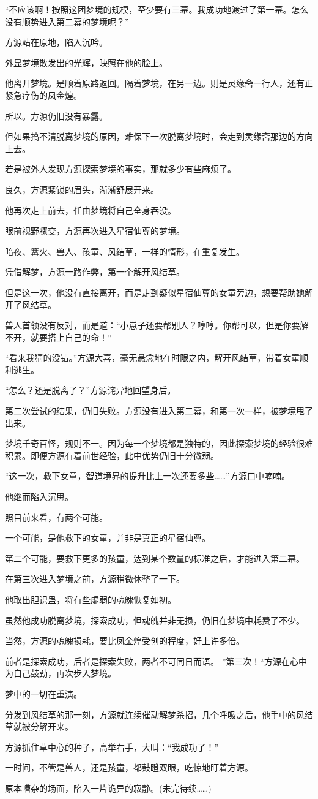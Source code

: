 \begin{this_body}
“不应该啊！按照这团梦境的规模，至少要有三幕。我成功地渡过了第一幕。怎么没有顺势进入第二幕的梦境呢？”

方源站在原地，陷入沉吟。

外显梦境散发出的光辉，映照在他的脸上。

他离开梦境。是顺着原路返回。隔着梦境，在另一边。则是灵缘斋一行人，还有正紧急疗伤的凤金煌。

所以。方源仍旧没有暴露。

但如果搞不清脱离梦境的原因，难保下一次脱离梦境时，会走到灵缘斋那边的方向上去。

若是被外人发现方源探索梦境的事实，那就多少有些麻烦了。

良久，方源紧锁的眉头，渐渐舒展开来。

他再次走上前去，任由梦境将自己全身吞没。

眼前视野骤变，方源再次进入星宿仙尊的梦境。

暗夜、篝火、兽人、孩童、风结草，一样的情形，在重复发生。

凭借解梦，方源一路作弊，第一个解开风结草。

但是这一次，他没有直接离开，而是走到疑似星宿仙尊的女童旁边，想要帮助她解开了风结草。

兽人首领没有反对，而是道：“小崽子还要帮别人？哼哼。你帮可以，但是你要解不开，就要搭上自己的命！”

“看来我猜的没错。”方源大喜，毫无悬念地在时限之内，解开风结草，带着女童顺利逃生。

“怎么？还是脱离了？”方源诧异地回望身后。

第二次尝试的结果，仍旧失败。方源没有进入第二幕，和第一次一样，被梦境甩了出来。

梦境千奇百怪，规则不一。因为每一个梦境都是独特的，因此探索梦境的经验很难积累。即便方源有着前世经验，此中优势仍旧十分微弱。

“这一次，救下女童，智道境界的提升比上一次还要多些……”方源口中喃喃。

他继而陷入沉思。

照目前来看，有两个可能。

一个可能，是他救下的女童，并非是真正的星宿仙尊。

第二个可能，要救下更多的孩童，达到某个数量的标准之后，才能进入第二幕。

在第三次进入梦境之前，方源稍微休整了一下。

他取出胆识蛊，将有些虚弱的魂魄恢复如初。

虽然他成功脱离梦境，探索成功，但魂魄并非无损，仍旧在梦境中耗费了不少。

当然，方源的魂魄损耗，要比凤金煌受创的程度，好上许多倍。

前者是探索成功，后者是探索失败，两者不可同日而语。 ”第三次！“方源在心中为自己鼓劲，再次步入梦境。

梦中的一切在重演。

分发到风结草的那一刻，方源就连续催动解梦杀招，几个呼吸之后，他手中的风结草就被分解开来。

方源抓住草中心的种子，高举右手，大叫：“我成功了！”

一时间，不管是兽人，还是孩童，都鼓瞪双眼，吃惊地盯着方源。

原本嘈杂的场面，陷入一片诡异的寂静。(未完待续……)

\end{this_body}

